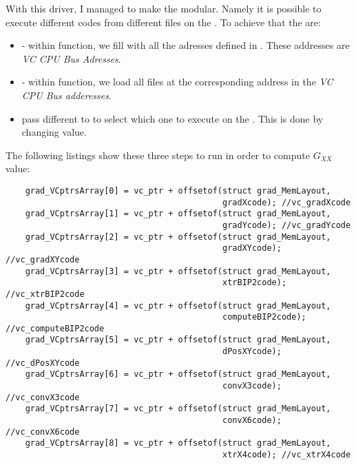 With this driver, I managed to make the \api{} modular. Namely it is possible to execute different codes from different  files on the \vc.
To achieve that the  are:

\begin{itemize}
	\item {} - within  function, we fill  with all the adresses defined in . These addresses are \emph{VC CPU Bus Adresses}.
	\item {} - within  function, we load all  files at the corresponding address in the \emph{VC CPU Bus adderesses}.
	\item pass different   to  to select which one to execute on the \vc. This is done by changing  value.
\end{itemize}

The following listings show these three steps to run  in order to compute $G_{XX}$ value:

\begin{lstlisting}
    grad_VCptrsArray[0] = vc_ptr + offsetof(struct grad_MemLayout,
                                            gradXcode); //vc_gradXcode
    grad_VCptrsArray[1] = vc_ptr + offsetof(struct grad_MemLayout,
                                            gradYcode); //vc_gradYcode
    grad_VCptrsArray[2] = vc_ptr + offsetof(struct grad_MemLayout,
                                            gradXYcode); //vc_gradXYcode
    grad_VCptrsArray[3] = vc_ptr + offsetof(struct grad_MemLayout,
                                            xtrBIP2code); //vc_xtrBIP2code
    grad_VCptrsArray[4] = vc_ptr + offsetof(struct grad_MemLayout,
                                            computeBIP2code); //vc_computeBIP2code
    grad_VCptrsArray[5] = vc_ptr + offsetof(struct grad_MemLayout,
                                            dPosXYcode); //vc_dPosXYcode
    grad_VCptrsArray[6] = vc_ptr + offsetof(struct grad_MemLayout,
                                            convX3code); //vc_convX3code
    grad_VCptrsArray[7] = vc_ptr + offsetof(struct grad_MemLayout,
                                            convX6code); //vc_convX6code
    grad_VCptrsArray[8] = vc_ptr + offsetof(struct grad_MemLayout,
                                            xtrX4code); //vc_xtrX4code
\end{lstlisting}
\newpage


